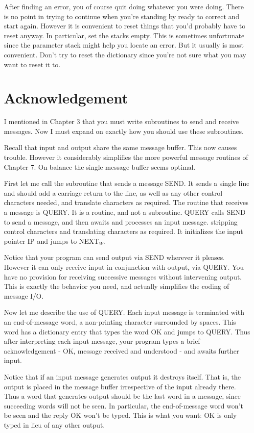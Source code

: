 \documentclass[b5paper, oneside]{book}
\begin{document}
After finding an error, you of course quit doing whatever you were doing. There is no point in trying to continue when you're standing by ready to correct and start again. However it is convenient to reset things that you'd probably have to reset anyway. In particular, set the stacks empty. This is sometimes unfortunate since the parameter stack might help you locate an error. But it usually is most convenient. Don't try to reset the dictionary since you're not sure what you may want to reset it to.

\section{Acknowledgement}
I mentioned in Chapter 3 that you must write subroutines to send and receive messages. Now I must expand on exactly how you should use these subroutines.

Recall that input and output share the same message buffer. This now causes trouble. However it considerably simplifies the more powerful message routines of Chapter 7. On balance the single message buffer seems optimal.

First let me call the subroutine that sends a message SEND. It sends a single line and should add a carriage return to the line, as well as any other control characters needed, and translate characters as required. The routine that receives a message is QUERY. It is a routine, and not a subroutine. QUERY calls SEND to send a message, and then awaits and processes an input message. stripping control characters and translating characters as required. It initializes the input pointer IP and jumps to NEXT$_W$.

Notice that your program can send output via SEND wherever it pleases. However it can only receive input in conjunction with output, via QUERY. You have no provision for receiving successive messages without intervening output. This is exactly the behavior you need, and actually simplifies the coding of message I/O.

Now let me describe the use of QUERY. Each input message is terminated with an end-of-message word, a non-printing character surrounded by spaces. This word has a dictionary entry that types the word OK and jumps to QUERY. Thus after interpreting each input message, your program types a brief acknowledgement - OK, message received and understood - and awaits further input.

Notice that if an input message generates output it destroys itself. That is, the output is placed in the message buffer irrespective of the input already there. Thus a word that generates output should be the last word in a message, since succeeding words will not be seen. In particular, the end-of-message word won't be seen and the reply OK won't be typed. This is what you want: OK is only typed in lieu of any other output.
\end{document}
